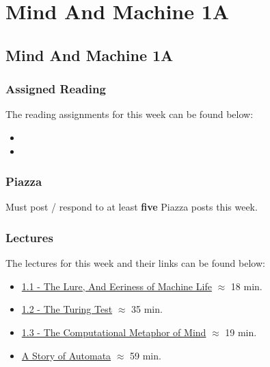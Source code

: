 \clearpage

\newcommand{\ChapTitle}{Mind And Machine 1A}
\newcommand{\SectionTitle}{Mind And Machine 1A}

\chapter{\ChapTitle}
\section{\SectionTitle}

\subsection{Assigned Reading}

The reading assignments for this week can be found below:

\begin{itemize}
    \item {}
    \item {}
\end{itemize}

\subsection{Piazza}

Must post / respond to at least \textbf{five} Piazza posts this week.  

\subsection{Lectures}

The lectures for this week and their links can be found below:

\begin{itemize}
    \item \href{https://www.youtube.com/watch?v=Ns8VEMUpZtc}{1.1 - The Lure, And Eeriness of Machine Life} $\approx$ 18 min.
    \item \href{https://www.youtube.com/watch?v=FrlctL4vEzo}{1.2 - The Turing Test} $\approx$ 35 min.
    \item \href{https://www.youtube.com/watch?v=WRQ7CwIO030}{1.3 - The Computational Metaphor of Mind} $\approx$ 19 min.
    \item \href{https://www.youtube.com/watch?v=YAg66jrvpHA}{A Story of Automata} $\approx$ 59 min.
\end{itemize}

